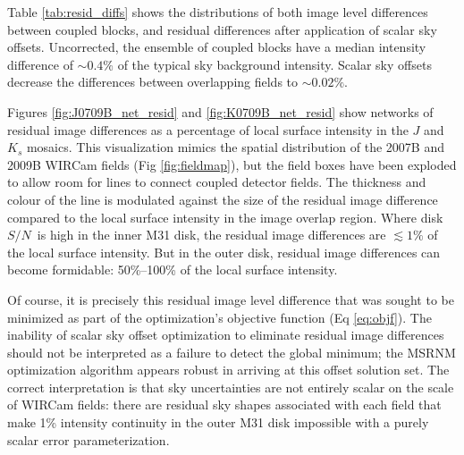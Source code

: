 \documentclass[iop]{emulateapj}
\newcommand{\sn}{\ensuremath{S/N}} %
\begin{document}
Table \ref{tab:resid_diffs} shows the distributions of both image level differences between coupled blocks, and residual differences after application of scalar sky offsets. Uncorrected, the ensemble of coupled blocks have a median intensity difference of $\sim 0.4\%$ of the typical sky background intensity. Scalar sky offsets decrease the differences between overlapping fields to $\sim 0.02\%$.

Figures \ref{fig:J0709B_net_resid} and \ref{fig:K0709B_net_resid} show networks of residual image differences as a percentage of local surface intensity in the $J$ and $K_s$ mosaics. This visualization mimics the spatial distribution of the 2007B and 2009B WIRCam fields (Fig \ref{fig:fieldmap}), but the field boxes have been exploded to allow room for lines to connect coupled detector fields. The thickness and colour of the line is modulated against the size of the residual image difference compared to the local surface intensity in the image overlap region. Where disk \sn\ is high in the inner M31 disk, the residual image differences are $\lesssim 1\%$ of the local surface intensity. But in the outer disk, residual image differences can become formidable: 50\%--100\% of the local surface intensity.

Of course, it is precisely this residual image level difference that was sought to be minimized as part of the optimization's objective function (Eq \ref{eq:objf}). The inability of scalar sky offset optimization to eliminate residual image differences should not be interpreted as a failure to detect the global minimum; the MSRNM optimization algorithm appears robust in arriving at this offset solution set. The correct interpretation is that sky uncertainties are not entirely scalar on the scale of WIRCam fields: there are residual sky shapes associated with each field that make 1\% intensity continuity in the outer M31 disk impossible with a purely scalar error parameterization.


\end{document}

